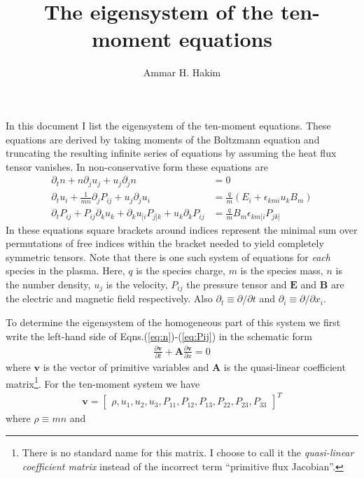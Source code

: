 \documentclass[11pt, reqno]{amsart}
\title[Tenmoment Eigensystem]{The eigensystem of the ten-moment
  equations}%
\author{Ammar H. Hakim}%
\date{}
\newcommand{\pfrac}[2]{\frac{\partial #1}{\partial #2}}
\newcommand{\mvec}[1]{\mathbf{#1}}
\theoremstyle{definition}
\begin{document}
\maketitle

In this document I list the eigensystem of the ten-moment
equations. These equations are derived by taking moments of the
Boltzmann equation and truncating the resulting infinite series of
equations by assuming the heat flux tensor vanishes. In
non-conservative form these equations are
\begin{align}
  \partial_t{n} + n \partial_j{u_j} + u_j \partial_j{n} &= 0 \label{eq:n} \\
  \partial_t{u_i}
  + \frac{1}{mn}\partial_j{P_{ij}}
  + u_j \partial_j{u_i} &=
  \frac{q}{m}\left(E_i + \epsilon_{kmi}u_kB_m\right) \label{eq:ui} \\
  \partial_t{P_{ij}} + P_{ij}\partial_k{u_k}
  + \partial_k{u_{[i}}P_{j]k}
  + u_k\partial_k{P_{ij}}
  &= \frac{q}{m}B_m \epsilon_{km[i}P_{jk]} \label{eq:Pij}
\end{align}
In these equations square brackets around indices represent the
minimal sum over permutations of free indices within the bracket
needed to yield completely symmetric tensors. Note that there is one
such system of equations for \emph{each} species in the plasma. Here,
$q$ is the species charge, $m$ is the species mass, $n$ is the number
density, $u_j$ is the velocity, $P_{ij}$ the pressure tensor and
$\mathbf{E}$ and $\mathbf{B}$ are the electric and magnetic field
respectively. Also $\partial_t \equiv \partial /\partial t$ and
$\partial_i \equiv \partial /\partial x_i$.

To determine the eigensystem of the homogeneous part of this system we
first write the left-hand side of
Eqns.\thinspace(\ref{eq:n})-(\ref{eq:Pij}) in the schematic form
\begin{align}
  \pfrac{\mvec{v}}{t} + \mvec{A}\pfrac{\mvec{v}}{x} = 0
\end{align}
where $\mvec{v}$ is the vector of primitive variables and $\mvec{A}$
is the quasi-linear coefficient matrix\footnote{There is no standard
  name for this matrix. I choose to call it the \emph{quasi-linear
    coefficient matrix} instead of the incorrect term ``primitive flux
  Jacobian''.}. For the ten-moment system we have
\begin{align}
  \mvec{v} = 
    \left[
    \begin{matrix}
      \rho,
      u_1,
      u_2,
      u_3,
      P_{11},
      P_{12},
      P_{13},
      P_{22},
      P_{23},
      P_{33}
    \end{matrix}
  \right]^T
\end{align}
where $\rho \equiv mn$ and 
\end{document}
